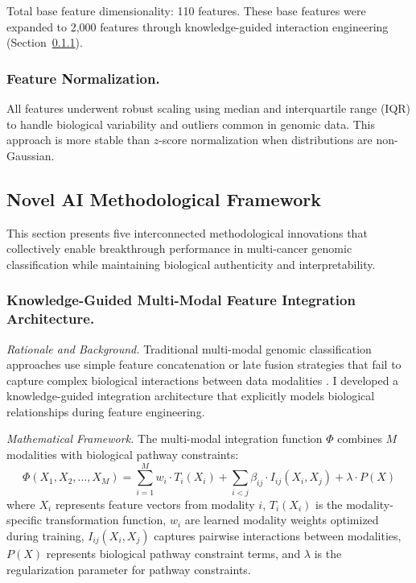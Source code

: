 \documentclass[manuscript, screen, review]{jair}
\begin{document}
Total base feature dimensionality: 110 features. These base features were expanded to 2,000 features through knowledge-guided interaction engineering (Section~\ref{sec:integration}).

\subsubsection{Feature Normalization.}

All features underwent robust scaling using median and interquartile range (IQR) to handle biological variability and outliers common in genomic data. This approach is more stable than $z$-score normalization when distributions are non-Gaussian.

\subsection{Novel AI Methodological Framework}
\label{sec:framework}

This section presents five interconnected methodological innovations that collectively enable breakthrough performance in multi-cancer genomic classification while maintaining biological authenticity and interpretability.

\subsubsection{Knowledge-Guided Multi-Modal Feature Integration Architecture.}
\label{sec:integration}

\emph{Rationale and Background.} Traditional multi-modal genomic classification approaches use simple feature concatenation or late fusion strategies that fail to capture complex biological interactions between data modalities \citep{ritchie2015methods,zitnik2019machine}. I developed a knowledge-guided integration architecture that explicitly models biological relationships during feature engineering.

\emph{Mathematical Framework.} The multi-modal integration function $\Phi$ combines $M$ modalities with biological pathway constraints:
\begin{equation}
  \Phi(X_1, X_2, \ldots, X_M) = \sum_{i=1}^{M} w_i \cdot T_i(X_i) + \sum_{i<j} \beta_{ij} \cdot I_{ij}(X_i, X_j) + \lambda \cdot P(X)
  \label{eq:integration}
\end{equation}
where $X_i$ represents feature vectors from modality $i$, $T_i(X_i)$ is the modality-specific transformation function, $w_i$ are learned modality weights optimized during training, $I_{ij}(X_i, X_j)$ captures pairwise interactions between modalities, $P(X)$ represents biological pathway constraint terms, and $\lambda$ is the regularization parameter for pathway constraints.
\end{document}
